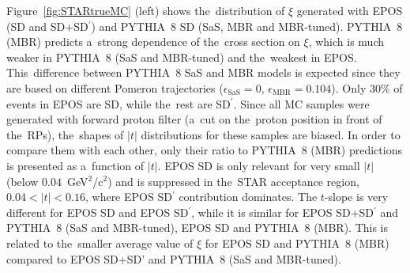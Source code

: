Figure~\ref{fig:STARtrueMC} (left) shows the~distribution of $\xi$ generated with  EPOS (SD and SD+SD$^\prime$) and PYTHIA~8 SD (SaS, MBR and MBR-tuned). PYTHIA~8 (MBR) predicts a~strong dependence of the~cross section on $\xi$, which is much weaker in PYTHIA~8 (SaS and MBR-tuned) and the~weakest in EPOS. This~difference between PYTHIA~8 SaS and MBR models is expected since they are based on different Pomeron trajectories ($\epsilon_\textrm{SaS}=0$, $\epsilon_\textrm{MBR}=0.104$). Only $30\%$ of events in EPOS are SD, while the~rest are SD$^\prime$. 
Since all MC samples were generated  with forward proton filter (a~cut on the~proton position  in front of the~RPs), 
the~shapes of $|t|$ distributions for these samples are biased. In order to compare them with each other, only their ratio to PYTHIA~8 (MBR) predictions is presented as a~function of $|t|$.
EPOS SD is only relevant for very small $|t|$ (below $0.04$~GeV$^2$/c$^2$) and is suppressed in the~STAR acceptance region, $0.04<|t|<0.16$, where EPOS SD$^\prime$ contribution dominates. The $t$-slope is  very different for EPOS SD and EPOS SD$^\prime$, while it is similar for EPOS SD+SD$^\prime$ and PYTHIA~8 (SaS and MBR-tuned),  EPOS SD and PYTHIA~8 (MBR). This is related to the~smaller average value of $\xi$ for EPOS SD and PYTHIA~8 (MBR) compared to EPOS SD+SD' and PYTHIA~8 (SaS and MBR-tuned). 
